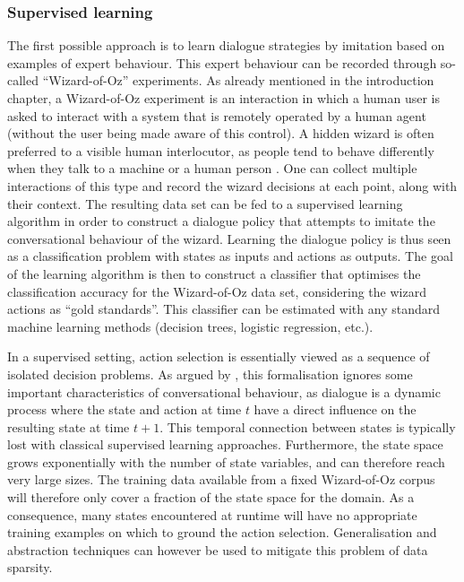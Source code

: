 \subsubsection*{Supervised learning}

The first possible approach is to learn dialogue strategies by imitation based on examples of expert behaviour.  This expert behaviour can be recorded through so-called ``Wizard-of-Oz'' experiments.  As already mentioned in the introduction chapter, a Wizard-of-Oz experiment is an interaction in which a human user is asked to interact with a system that is remotely operated by a human agent (without the user being made aware of this control).  A hidden wizard is often preferred to a visible human interlocutor, as people tend to behave differently when they talk to a machine or a human person \citep{JonnsonD88}.  One can collect multiple interactions of this type and record the wizard decisions at each point, along with their context.   The resulting data set can be fed to a supervised learning algorithm in order to construct a dialogue policy that attempts to imitate the conversational behaviour of the wizard.  Learning the dialogue policy is thus seen as a classification problem with states as inputs and actions as outputs. The goal of the learning algorithm is then to construct a classifier  that optimises the classification accuracy for the Wizard-of-Oz data set, considering the wizard actions as ``gold standards''.  This classifier can be estimated with any standard machine learning methods (decision trees, logistic regression, etc.).
 
In a supervised setting, action selection is essentially viewed as a sequence of isolated decision problems.  As argued by \cite{817450}, this formalisation ignores some important characteristics of conversational behaviour, as dialogue is a dynamic process where the state and action at time $t$ have a direct influence on the resulting state at time $t+1$.  This temporal connection between states is typically lost with classical supervised learning approaches. Furthermore, the state space grows exponentially with the number of state variables, and can therefore reach very large sizes.  The training data available from a fixed Wizard-of-Oz corpus will therefore only cover a fraction of the state space for the domain.  As a consequence, many states encountered at runtime will have no appropriate training examples on which to ground the action selection.  Generalisation and abstraction techniques can however be used to mitigate this problem of data sparsity.

